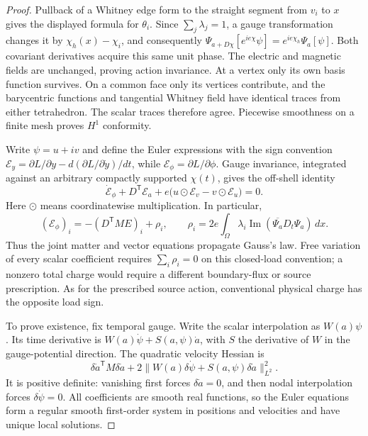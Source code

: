 \begin{proof}
Pullback of a Whitney edge form to the straight segment from \(v_i\)
to \(x\) gives the displayed formula for \(\theta_i\). Since
\(\sum_j\lambda_j=1\), a gauge transformation changes it by
\(\chi_h(x)-\chi_i\), and consequently
\(\Psi_{a+D\chi}[e^{ie\chi}\psi]=e^{ie\chi_h}\Psi_a[\psi]\).
Both covariant derivatives acquire this same unit phase. The electric and
magnetic fields are unchanged, proving action invariance.
At a vertex only its own basis function survives. On a common face only
its vertices contribute, and the barycentric functions and tangential
Whitney field have identical traces from either tetrahedron. The scalar
traces therefore agree. Piecewise smoothness on a finite mesh proves
\(H^1\) conformity.

Write \(\psi=u+iv\) and define the Euler expressions with the sign
convention \(\mathcal E_y=\partial L/\partial y-
d(\partial L/\partial\dot y)/dt\), while
\(\mathcal E_\phi=\partial L/\partial\phi\).
Gauge invariance, integrated against an arbitrary compactly supported
\(\chi(t)\), gives the off-shell identity
\begin{equation}
 \dot{\mathcal E}_\phi+D^{\mathsf T}\mathcal E_a
       +e\bigl(u\mathbin{\odot}\mathcal E_v
                         -v\mathbin{\odot}\mathcal E_u\bigr)=0.
 \label{eq:whitney-matter-noether}
\end{equation}
Here \(\odot\) means coordinatewise multiplication. In particular,
\[
 (\mathcal E_\phi)_i=-(D^{\mathsf T}ME)_i+\rho_i,
 \qquad
 \rho_i=2e\int_\Omega\lambda_i
                   \operatorname{Im}(\overline{\Psi_a}D_t\Psi_a)\,dx.
\]
Thus the joint matter and vector equations propagate Gauss's law. Free
variation of every scalar coefficient requires \(\sum_i\rho_i=0\)
on this closed-load convention; a nonzero total charge would require a
different boundary-flux or source prescription. As for the prescribed
source action, conventional physical charge has the opposite load sign.

To prove existence, fix temporal gauge. Write the scalar interpolation as
\(W(a)\psi\). Its time derivative is
\(W(a)\dot\psi+S(a,\psi)\dot a\), with \(S\) the derivative
of \(W\) in the gauge-potential direction. The quadratic velocity
Hessian is
\[
 \delta\dot a^{\mathsf T}M\delta\dot a
 +2\|W(a)\delta\dot\psi+S(a,\psi)\delta\dot a\|_{L^2}^2.
\]
It is positive definite: vanishing first forces
\(\delta\dot a=0\), and then nodal interpolation forces
\(\delta\dot\psi=0\). All coefficients are smooth real functions,
so the Euler equations form a regular smooth first-order system in
positions and velocities and have unique local solutions.


\end{proof}
